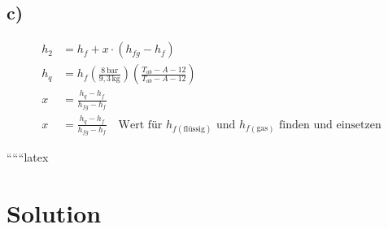 

\subsection*{c)}

\begin{align*}
    h_2 &= h_f + x \cdot (h_{fg} - h_f) \\
    h_q &= h_f \left( \frac{8 \, \text{bar}}{9,3 \, \text{kg}} \right) \left( \frac{T_{ab} - A - 12}{T_{ab} - A - 12} \right) \\
    x &= \frac{h_q - h_{f}}{h_{fg} - h_{f}} \\
    x &= \frac{h_q - h_{f}}{h_{fg} - h_{f}} \quad \text{Wert für } h_{f(\text{flüssig})} \text{ und } h_{f(\text{gas})} \text{ finden und einsetzen}
\end{align*}

``````latex


\section*{Solution}